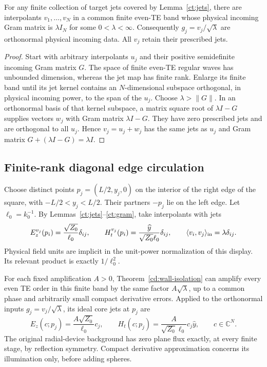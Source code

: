 \begin{lemma}
\label{ct:gram}
For any finite collection of target jets covered by Lemma~\ref{ct:jets},
there are interpolants $v_1,\ldots,v_N$ in a common finite even-TE
band whose physical incoming Gram matrix is $\lambda I_N$ for some
$0<\lambda<\infty$. Consequently $g_j=v_j/\sqrt\lambda$ are
orthonormal physical incoming data. All $v_j$ retain their prescribed
jets.
\end{lemma}
\begin{proof}
Start with arbitrary interpolants $u_j$ and their positive
semidefinite incoming Gram matrix $G$. The space of finite even-TE
regular waves has unbounded dimension, whereas the jet map has
finite rank. Enlarge its finite band until its jet kernel contains
an $N$-dimensional subspace orthogonal, in physical incoming power,
to the span of the $u_j$. Choose $\lambda>\|G\|$.
In an orthonormal basis of that kernel subspace, a matrix square
root of $\lambda I-G$ supplies vectors $w_j$ with Gram matrix
$\lambda I-G$. They have zero prescribed jets and are orthogonal
to all $u_j$. Hence $v_j=u_j+w_j$ has the same jets as $u_j$ and
Gram matrix $G+(\lambda I-G)=\lambda I$.
\end{proof}

\subsection{Finite-rank diagonal edge circulation}

Choose distinct points $p_j=(L/2,y_j,0)$ on the interior of the
right edge of the square, with $-L/2<y_j<L/2$. Their partners
$-p_j$ lie on the left edge. Let $\ell_0=k_0^{-1}$.
By Lemmas~\ref{ct:jets}--\ref{ct:gram}, take interpolants with jets
\begin{equation}\label{ct:unitjets}
 E_z^{v_j}(p_i)=\frac{\sqrt{Z_0}}{\ell_0}\delta_{ij},\qquad
 H_t^{v_j}(p_i)=\frac{\widehat y}{\sqrt{Z_0}\ell_0}\delta_{ij},
 \qquad \langle v_i,v_j\rangle_{\rm in}=\lambda\delta_{ij}.
\end{equation}
Physical field units are implicit in the unit-power normalization
of this display. Its relevant product is exactly $1/\ell_0^2$.

For each fixed amplification $A>0$, Theorem~\ref{cd:wall-isolation}
can amplify every even TE order in this finite band by the same
factor $A\sqrt\lambda$, up to a common phase and arbitrarily small
compact derivative errors. Applied to the orthonormal inputs
$g_j=v_j/\sqrt\lambda$, its ideal core jets at $p_j$ are
\begin{equation}\label{ct:amplifiedjets}
 E_z(c;p_j)=\frac{A\sqrt{Z_0}}{\ell_0}c_j,\qquad
 H_t(c;p_j)=\frac{A}{\sqrt{Z_0}\ell_0}c_j\widehat y,
 \qquad c\in\mathbb C^N.
\end{equation}
The original radial-device background has zero plane flux exactly,
at every finite stage, by reflection symmetry. Compact derivative
approximation concerns its illumination only, before adding spheres.

